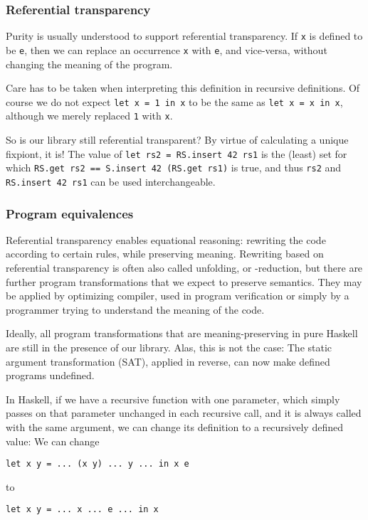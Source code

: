 \documentclass[manuscript,screen,acmsmall]{acmart}
\begin{document}
\subsubsection{Referential transparency}

Purity is usually understood to support referential transparency. If \verb|x| is defined to be \verb|e|, then we can replace an occurrence \verb|x| with \verb|e|, and vice-versa, without changing the meaning of the program.

Care has to be taken when interpreting this definition in recursive definitions. Of course we do not expect \verb|let x = 1 in x| to be the same as \verb|let x = x in x|, although we merely replaced \verb|1| with \verb|x|.

So is our library still referential transparent? By virtue of calculating a unique fixpiont, it is!  The value of \verb|let rs2 = RS.insert 42 rs1| is the (least) set for which \verb|RS.get rs2 == S.insert 42 (RS.get rs1)| is true, and thus \verb|rs2| and \verb|RS.insert 42 rs1| can be used interchangeable.

\subsubsection{Program equivalences}\label{sec:sat}

Referential transparency enables equational reasoning: rewriting the code according to certain rules, while preserving meaning. Rewriting based on referential transparency is often also called unfolding, or \textdelta-reduction, but there are further program transformations that we expect to preserve semantics. They may be applied by optimizing compiler, used in program verification or simply by a programmer trying to understand the meaning of the code.

Ideally, all program transformations that are meaning-preserving in pure Haskell are still in the presence of our library. Alas, this is not the case: The static argument transformation (SAT), applied in reverse, can now make defined programs undefined.

In Haskell, if we have a recursive function with one parameter, which simply passes on that parameter unchanged in each recursive call, and it is always called with the same argument, we can change its definition to a recursively defined value: We can change
\begin{verbatim}
let x y = ... (x y) ... y ... in x e
\end{verbatim}
to
\begin{verbatim}
let x y = ... x ... e ... in x
\end{verbatim}
\end{document}
